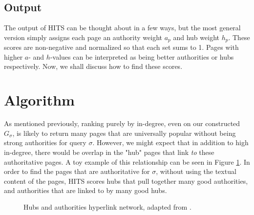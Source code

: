 \documentclass[11pt]{article}
\begin{document}
\subsection{Output}
The output of HITS can be thought about in a few ways, but the most general version simply assigns each page an authority weight $a_p$ and hub weight $h_p$.
These scores are non-negative and normalized so that each set sums to 1.
Pages with higher $a$- and $h$-values can be interpreted as being better authorities or hubs respectively.
Now, we shall discuss how to find these scores.

\section{Algorithm}
As mentioned previously, ranking purely by in-degree, even on our constructed $G_\sigma$, is likely to return many pages that are universally popular without being strong authorities for query $\sigma$.
However, we might expect that in addition to high in-degree, there would be overlap in the "hub" pages that link \textit{to} these authoritative pages.
A toy example of this relationship can be seen in Figure \ref{fig:hub-auth}.
In order to find the pages that are authoritative for $\sigma$, without using the textual content of the pages, HITS scores hubs that pull together many good authorities, and authorities that are linked to by many good hubs.

\begin{figure}[ht]
\centering
{}
\caption{Hubs and authorities hyperlink network, adapted from \cite{kleinberg_authoritative_1999}.}
\label{fig:hub-auth}
\end{figure}
\end{document}
